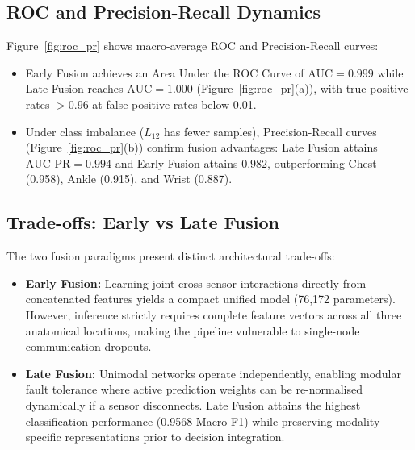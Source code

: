 \documentclass[10pt,twocolumn]{article}
\begin{document}
\subsection{ROC and Precision-Recall Dynamics}
Figure~\ref{fig:roc_pr} shows macro-average ROC and Precision-Recall curves:
\begin{itemize}
    \item Early Fusion achieves an Area Under the ROC Curve of $\text{AUC} = 0.999$ while Late Fusion reaches $\text{AUC} = 1.000$ (Figure~\ref{fig:roc_pr}(a)), with true positive rates $>0.96$ at false positive rates below 0.01.
    \item Under class imbalance ($L_{12}$ has fewer samples), Precision-Recall curves (Figure~\ref{fig:roc_pr}(b)) confirm fusion advantages: Late Fusion attains $\text{AUC-PR} = 0.994$ and Early Fusion attains $0.982$, outperforming Chest (0.958), Ankle (0.915), and Wrist (0.887).
\end{itemize}

\subsection{Trade-offs: Early vs Late Fusion}
The two fusion paradigms present distinct architectural trade-offs:
\begin{itemize}
    \item \textbf{Early Fusion:} Learning joint cross-sensor interactions directly from concatenated features yields a compact unified model (76,172 parameters). However, inference strictly requires complete feature vectors across all three anatomical locations, making the pipeline vulnerable to single-node communication dropouts.
    \item \textbf{Late Fusion:} Unimodal networks operate independently, enabling modular fault tolerance where active prediction weights can be re-normalised dynamically if a sensor disconnects. Late Fusion attains the highest classification performance (0.9568 Macro-F1) while preserving modality-specific representations prior to decision integration.
\end{itemize}
\end{document}
